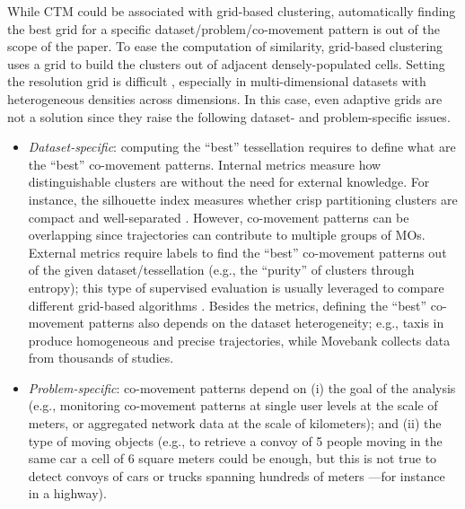 \documentclass[
]{ceurart}
\begin{document}
While CTM could be associated with grid-based clustering, automatically finding the best grid for a specific dataset/problem/co-movement pattern is out of the scope of the paper.
To ease the computation of similarity, grid-based clustering uses a grid to build the clusters out of adjacent densely-populated cells.
Setting the resolution grid is difficult \citep{parsons2004evaluating,DBLP:journals/tkde/JinHZXFOZ22}, especially in multi-dimensional datasets with heterogeneous densities across dimensions.
In this case, even adaptive grids \citep{DBLP:conf/adma/LuSXL05}
are not a solution since they raise the following dataset- and problem-specific issues.
\begin{itemize}
    \item \textit{Dataset-specific}: computing the ``best'' tessellation requires to define what are the ``best'' co-movement patterns.
    Internal metrics measure how distinguishable clusters are without the need for external knowledge.
    For instance, the silhouette index measures whether crisp partitioning clusters are compact and well-separated \citep{zhu2010clustering}.
    However, co-movement patterns can be overlapping since trajectories can contribute to multiple groups of MOs.
    External metrics require labels to find the ``best'' co-movement patterns out of the given dataset/tessellation (e.g., the ``purity'' of clusters through entropy); this type of supervised evaluation is usually leveraged to compare different grid-based algorithms \citep{parsons2004evaluating}.
    Besides the metrics, defining the ``best'' co-movement patterns also depends on the dataset heterogeneity; e.g., taxis in \citep{DBLP:conf/gis/YuanZZXXSH10} produce homogeneous and precise trajectories, while Movebank \citep{DBLP:journals/envsoft/KranstauberCWFTWK11} collects data from thousands of studies.
    \item \textit{Problem-specific}: co-movement patterns depend on (i) the goal of the analysis (e.g., monitoring co-movement patterns at single user levels at the scale of meters, or aggregated network data
    at the scale of kilometers); and (ii) the type of moving objects (e.g., to retrieve a convoy of 5 people moving in the same car a cell of 6 square meters could be enough, but this is not true to detect convoys of cars or trucks spanning hundreds of meters ---for instance in a highway).
\end{itemize}
\end{document}
